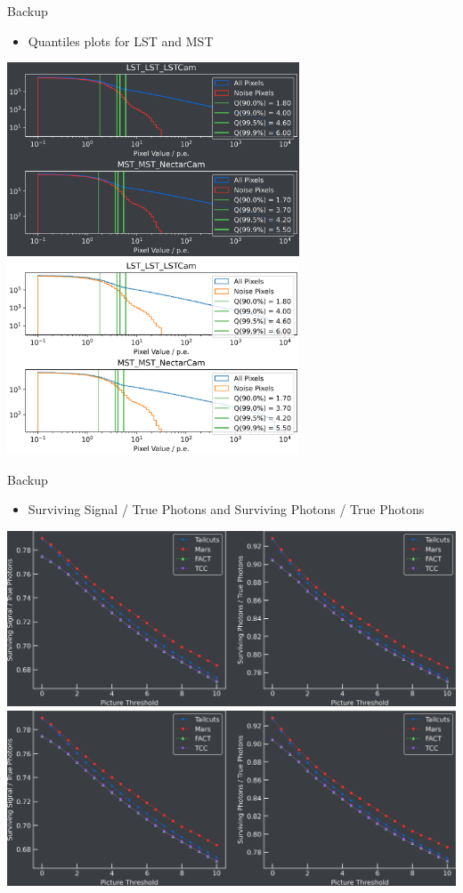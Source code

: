 \begin{frame}{Backup}
    \begin{itemize}
        \item Quantiles plots for LST and MST
    \end{itemize}
    \centering
    \ifdefined\darktheme
        \includegraphics[width=0.65\textwidth]{plots/noise_study/quantiles_dark.png}
    \else
        \includegraphics[width=0.65\textwidth]{plots/noise_study/quantiles_light.png}
    \fi
\end{frame}
\begin{frame}{Backup}
    \begin{itemize}
        \item Surviving Signal / True Photons and Surviving Photons / True Photons
    \end{itemize}
    \centering
    \ifdefined\darktheme
        \includegraphics[width=\textwidth]{plots/survsignal_dark.png}
    \else
        \includegraphics[width=\textwidth]{plots/survsignal_dark.png}
    \fi
\end{frame}

